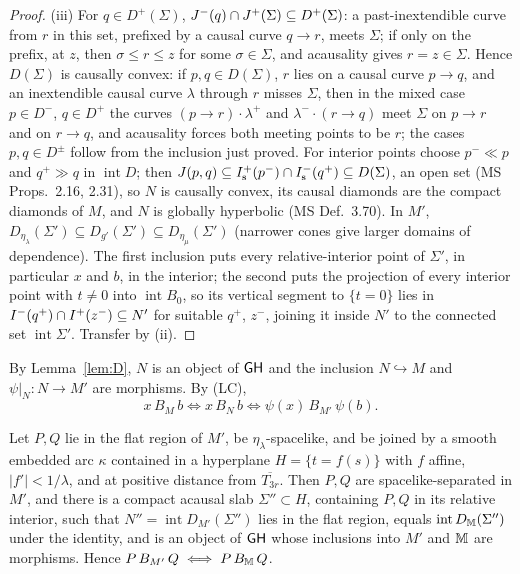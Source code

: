 \begin{proof}
(iii) For $q\in D^+(\Sigma)$, $J^{-}(q)\cap J^{+}(\Sigma)\subseteq D^+(\Sigma)$: a
past-inextendible curve from $r$ in this set, prefixed by a causal curve
$q\to r$, meets $\Sigma$; if only on the prefix, at $z$, then $\sigma\le r\le z$
for some $\sigma\in\Sigma$, and acausality gives $r=z\in\Sigma$. Hence $D(\Sigma)$
is causally convex: if $p,q\in D(\Sigma)$, $r$ lies on a causal curve $p\to q$,
and an inextendible causal curve $\lambda$ through $r$ misses $\Sigma$, then in
the mixed case $p\in D^-$, $q\in D^+$ the curves $(p\to r)\cdot\lambda^+$ and
$\lambda^-\cdot(r\to q)$ meet $\Sigma$ on $p\to r$ and on $r\to q$, and
acausality forces both meeting points to be $r$; the cases $p,q\in D^\pm$
follow from the inclusion just proved. For interior points choose $p^-\ll p$
and $q^+\gg q$ in $\operatorname{int}D$; then
$J(p,q)\subseteq I^{+}_{\mathrm s}(p^-)\cap I^{-}_{\mathrm s}(q^+)\subseteq
D(\Sigma)$, an open set (MS Props.~2.16, 2.31), so $N$ is causally convex, its causal diamonds are the
compact diamonds of $M$, and $N$ is globally hyperbolic (MS Def.~3.70). In
$M'$,
$D_{\eta_\lambda}(\Sigma')\subseteq D_{g'}(\Sigma')\subseteq D_{\eta_\mu}(\Sigma')$
(narrower cones give larger domains of dependence). The first inclusion puts
every relative-interior point of $\Sigma'$, in particular $x$ and $b$, in the
interior; the second puts the projection of every interior point with $t\neq0$
into $\operatorname{int}B_0$, so its vertical segment to $\{t=0\}$ lies in
$I^{-}(q^+)\cap I^{+}(z^-)\subseteq N'$ for suitable $q^+$, $z^-$, joining it
inside $N'$ to the connected set $\operatorname{int}\Sigma'$. Transfer by (ii).
\end{proof}

By Lemma~\ref{lem:D}, $N$ is an object of $\mathsf{GH}$ and the inclusion $N\hookrightarrow
M$ and $\psi|_N:N\to M'$ are morphisms. By (LC),
\begin{equation}\label{eq:transfer}
x\,B_M\,b\iff x\,B_N\,b\iff\psi(x)\,B_{M'}\,\psi(b).
\end{equation}

\begin{lemma}\label{lem:F}
Let $P,Q$ lie in the flat region of $M'$, be $\eta_\lambda$-spacelike, and be
joined by a smooth embedded arc $\kappa$ contained in a hyperplane
$H=\{t=f(s)\}$ with $f$ affine, $|f'|<1/\lambda$, and at positive distance from
$\overline{T_{3r}}$. Then $P,Q$ are spacelike-separated in $M'$, and there is a
compact acausal slab $\Sigma''\subset H$, containing $P,Q$ in its relative
interior, such that $N''=\operatorname{int}D_{M'}(\Sigma'')$ lies in the flat
region, equals $\operatorname{int}D_\mathbb M(\Sigma'')$ under the identity, and is
an object of $\mathsf{GH}$ whose inclusions into $M'$ and $\mathbb M$ are morphisms. Hence
$P\,B_{M'}\,Q\iff P\,B_\mathbb M\,Q$.
\end{lemma}

